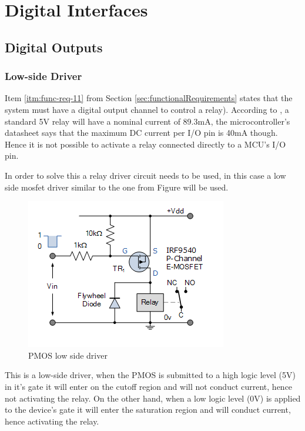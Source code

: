 \section{Digital Interfaces}\label{sec:digital-interfaces}

	\subsection{Digital Outputs}\label{ssec:digital-outputs}

		\subsubsection{Low-side Driver}\label{sssec:digital-outputs-low-side-driver}

			Item \ref{itm:func-req-11} from Section \ref{sec:functionalRequirements} states that the system must have a digital output channel to control a relay). According to \cite{songle-relay-datasheet}, a standard 5V relay will have a nominal current of 89.3mA, the microcontroller's datasheet \cite{atmega32u4-datasheet} says that the maximum DC current per I/O pin is 40mA though. Hence it is not possible to activate a relay connected directly to a MCU's I/O pin.
			\par 
			In order to solve this a relay driver circuit needs to be used, in this case a low side mosfet driver similar to the one from Figure \cite{pmos-low-side-driver} will be used.

			\begin{figure}[htbp]
				\centering
				\includegraphics[width=.5\textwidth]{figuras/fig-pmos-low-side-driver.png}
				\caption{PMOS low side driver \cite{pmos-low-side-driver}}
				\label{fig:pmos-low-side-driver}
			\end{figure}

			This is a low-side driver, when the PMOS is submitted to a high logic level (5V) in it's gate it will enter on the cutoff region and will not conduct current, hence not activating the relay. On the other hand, when a low logic level (0V) is applied to the device's gate it will enter the saturation region and will conduct current, hence activating the relay.

